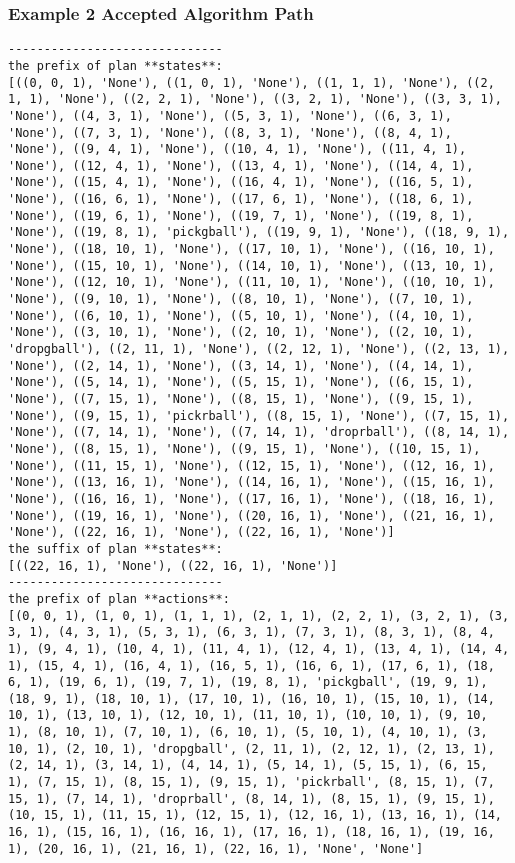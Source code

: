 \subsubsection{Example 2 Accepted Algorithm Path}
\begin{lstlisting}
------------------------------
the prefix of plan **states**:
[((0, 0, 1), 'None'), ((1, 0, 1), 'None'), ((1, 1, 1), 'None'), ((2, 1, 1), 'None'), ((2, 2, 1), 'None'), ((3, 2, 1), 'None'), ((3, 3, 1), 'None'), ((4, 3, 1), 'None'), ((5, 3, 1), 'None'), ((6, 3, 1), 'None'), ((7, 3, 1), 'None'), ((8, 3, 1), 'None'), ((8, 4, 1), 'None'), ((9, 4, 1), 'None'), ((10, 4, 1), 'None'), ((11, 4, 1), 'None'), ((12, 4, 1), 'None'), ((13, 4, 1), 'None'), ((14, 4, 1), 'None'), ((15, 4, 1), 'None'), ((16, 4, 1), 'None'), ((16, 5, 1), 'None'), ((16, 6, 1), 'None'), ((17, 6, 1), 'None'), ((18, 6, 1), 'None'), ((19, 6, 1), 'None'), ((19, 7, 1), 'None'), ((19, 8, 1), 'None'), ((19, 8, 1), 'pickgball'), ((19, 9, 1), 'None'), ((18, 9, 1), 'None'), ((18, 10, 1), 'None'), ((17, 10, 1), 'None'), ((16, 10, 1), 'None'), ((15, 10, 1), 'None'), ((14, 10, 1), 'None'), ((13, 10, 1), 'None'), ((12, 10, 1), 'None'), ((11, 10, 1), 'None'), ((10, 10, 1), 'None'), ((9, 10, 1), 'None'), ((8, 10, 1), 'None'), ((7, 10, 1), 'None'), ((6, 10, 1), 'None'), ((5, 10, 1), 'None'), ((4, 10, 1), 'None'), ((3, 10, 1), 'None'), ((2, 10, 1), 'None'), ((2, 10, 1), 'dropgball'), ((2, 11, 1), 'None'), ((2, 12, 1), 'None'), ((2, 13, 1), 'None'), ((2, 14, 1), 'None'), ((3, 14, 1), 'None'), ((4, 14, 1), 'None'), ((5, 14, 1), 'None'), ((5, 15, 1), 'None'), ((6, 15, 1), 'None'), ((7, 15, 1), 'None'), ((8, 15, 1), 'None'), ((9, 15, 1), 'None'), ((9, 15, 1), 'pickrball'), ((8, 15, 1), 'None'), ((7, 15, 1), 'None'), ((7, 14, 1), 'None'), ((7, 14, 1), 'droprball'), ((8, 14, 1), 'None'), ((8, 15, 1), 'None'), ((9, 15, 1), 'None'), ((10, 15, 1), 'None'), ((11, 15, 1), 'None'), ((12, 15, 1), 'None'), ((12, 16, 1), 'None'), ((13, 16, 1), 'None'), ((14, 16, 1), 'None'), ((15, 16, 1), 'None'), ((16, 16, 1), 'None'), ((17, 16, 1), 'None'), ((18, 16, 1), 'None'), ((19, 16, 1), 'None'), ((20, 16, 1), 'None'), ((21, 16, 1), 'None'), ((22, 16, 1), 'None'), ((22, 16, 1), 'None')]
the suffix of plan **states**:
[((22, 16, 1), 'None'), ((22, 16, 1), 'None')]
------------------------------
the prefix of plan **actions**:
[(0, 0, 1), (1, 0, 1), (1, 1, 1), (2, 1, 1), (2, 2, 1), (3, 2, 1), (3, 3, 1), (4, 3, 1), (5, 3, 1), (6, 3, 1), (7, 3, 1), (8, 3, 1), (8, 4, 1), (9, 4, 1), (10, 4, 1), (11, 4, 1), (12, 4, 1), (13, 4, 1), (14, 4, 1), (15, 4, 1), (16, 4, 1), (16, 5, 1), (16, 6, 1), (17, 6, 1), (18, 6, 1), (19, 6, 1), (19, 7, 1), (19, 8, 1), 'pickgball', (19, 9, 1), (18, 9, 1), (18, 10, 1), (17, 10, 1), (16, 10, 1), (15, 10, 1), (14, 10, 1), (13, 10, 1), (12, 10, 1), (11, 10, 1), (10, 10, 1), (9, 10, 1), (8, 10, 1), (7, 10, 1), (6, 10, 1), (5, 10, 1), (4, 10, 1), (3, 10, 1), (2, 10, 1), 'dropgball', (2, 11, 1), (2, 12, 1), (2, 13, 1), (2, 14, 1), (3, 14, 1), (4, 14, 1), (5, 14, 1), (5, 15, 1), (6, 15, 1), (7, 15, 1), (8, 15, 1), (9, 15, 1), 'pickrball', (8, 15, 1), (7, 15, 1), (7, 14, 1), 'droprball', (8, 14, 1), (8, 15, 1), (9, 15, 1), (10, 15, 1), (11, 15, 1), (12, 15, 1), (12, 16, 1), (13, 16, 1), (14, 16, 1), (15, 16, 1), (16, 16, 1), (17, 16, 1), (18, 16, 1), (19, 16, 1), (20, 16, 1), (21, 16, 1), (22, 16, 1), 'None', 'None']

\end{lstlisting}

